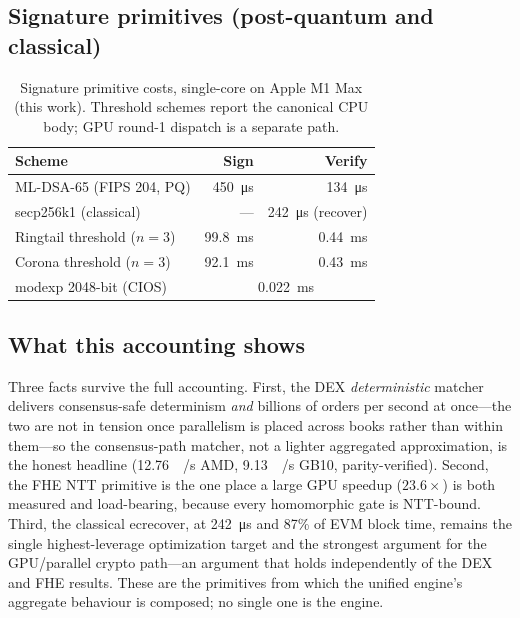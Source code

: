 \subsection{Signature primitives (post-quantum and classical)}

\begin{table}[h]
\centering
\caption{Signature primitive costs, single-core on Apple M1 Max (this work). Threshold schemes
report the canonical CPU body; GPU round-1 dispatch is a separate path.}
\label{tab:acct-sig}
\begin{tabular}{lrr}
\toprule
\textbf{Scheme} & \textbf{Sign} & \textbf{Verify} \\
\midrule
ML-DSA-65 (FIPS 204, PQ)      & \SI{450}{\micro\second} & \SI{134}{\micro\second} \\
secp256k1 (classical)         & --- & \SI{242}{\micro\second} (recover) \\
Ringtail threshold ($n{=}3$)  & \SI{99.8}{\milli\second} & \SI{0.44}{\milli\second} \\
Corona threshold ($n{=}3$)    & \SI{92.1}{\milli\second} & \SI{0.43}{\milli\second} \\
modexp 2048-bit (CIOS)        & \multicolumn{2}{c}{\SI{0.022}{\milli\second}} \\
\bottomrule
\end{tabular}
\end{table}

\subsection{What this accounting shows}

Three facts survive the full accounting. First, the DEX \emph{deterministic} matcher delivers
consensus-safe determinism \emph{and} billions of orders per second at once---the two are not in
tension once parallelism is placed across books rather than within them---so the consensus-path
matcher, not a lighter aggregated approximation, is the honest headline
(\SI{12.76}{\giga{}/\second} AMD, \SI{9.13}{\giga{}/\second} GB10, parity-verified).
Second, the FHE NTT primitive is the one place a large GPU speedup ($23.6\times$) is both measured
and load-bearing, because every homomorphic gate is NTT-bound. Third, the classical ecrecover, at
\SI{242}{\micro\second} and 87\% of EVM block time, remains the single highest-leverage
optimization target and the strongest argument for the GPU/parallel crypto path---an argument that
holds independently of the DEX and FHE results. These are the primitives from which the unified
engine's aggregate behaviour is composed; no single one is the engine.
